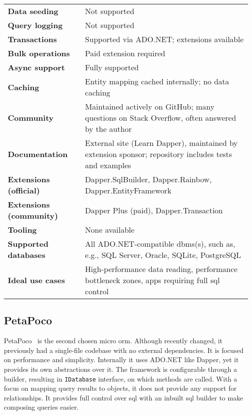 {\begin{landscape}
\begin{table}[p]
\begin{tabular}{
>{\raggedright\arraybackslash}p{40.00mm}
>{\arraybackslash}p{150.00mm}
}
\textbf{Data seeding} & Not supported \\
\textbf{Query logging} & Not supported \\
\textbf{Transactions} & Supported via ADO.NET; extensions available \\
\textbf{Bulk operations} & Paid extension required \\
\textbf{Async support} & Fully supported \\
\textbf{Caching} & Entity mapping cached internally; no data caching \\
\textbf{Community} & Maintained actively on GitHub; many questions on Stack Overflow, often answered by the author \\
\textbf{Documentation} & External site (Learn Dapper), maintained by extension sponsor; repository includes tests and examples \\
\textbf{Extensions (official)} & Dapper.SqlBuilder, Dapper.Rainbow, Dapper.EntityFramework \\
\textbf{Extensions (community)} & Dapper Plus (paid), Dapper.Transaction \\
\textbf{Tooling} & None available \\
\textbf{Supported databases} & All ADO.NET-compatible \acrshort{dbms}(s), such as, e.g., SQL Server, Oracle, SQLite, PostgreSQL \\
\textbf{Ideal use cases} & High-performance data reading, performance bottleneck zones, apps requiring full \acrshort{sql} control \\
\bottomrule
\end{tabular}
\end{table}
\end{landscape}
}

\subsection{PetaPoco}
\label{sec:feat_petapoco}

PetaPoco~\cite{PetaPoco} is the second chosen micro \acrshort{orm}. Although recently changed, it previously had a single-file codebase with no external dependencies. It is focused on performance and simplicity. Internally it uses ADO.NET like Dapper, yet it provides its own abstractions over it. The framework is configurable through a builder, resulting in \texttt{IDatabase} interface, on which methods are called. With a focus on mapping query results to objects, it does not provide any support for relationships. It provides full control over \acrshort{sql} with an inbuilt \acrshort{sql} builder to make composing queries easier. 

